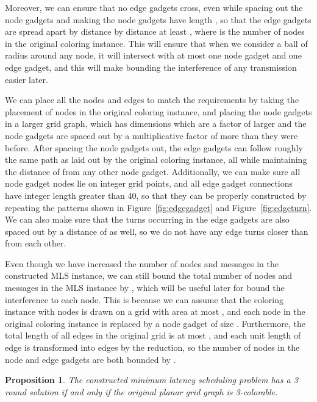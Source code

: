 \documentclass{article}
\newtheorem{proposition}[lemma]{Proposition}
\begin{document}
Moreover, we can ensure that no edge gadgets cross, even while spacing out the node gadgets and making the node gadgets have length , so that the edge gadgets are spread apart by distance by distance at least , where  is the number of nodes in the original coloring instance.  This will ensure that when we consider a ball of radius  around any node, it will intersect with at most one node gadget and one edge gadget, and this will make bounding the interference of any transmission easier later.

We can place all the nodes and edges to match the requirements by taking the placement of nodes in the original coloring instance, and placing the node gadgets in a larger grid graph, which has dimensions which are a factor of  larger and the node gadgets are spaced out by a multiplicative factor of  more than they were before.  After spacing the node gadgets out, the edge gadgets can follow roughly the same path as laid out by the original coloring instance, all while maintaining the distance of  from any other node gadget.  Additionally, we can make sure all node gadget nodes lie on integer grid points, and all edge gadget connections have integer length greater than 40, so that they can be properly constructed by repeating the patterns shown in Figure~\ref{fig:edgegadget} and Figure~\ref{fig:edgeturn}.  We can also make sure that the turns occurring in the edge gadgets are also spaced out by a distance of  as well, so we do not have any edge turns closer than  from each other.

Even though we have increased the number of nodes and messages in the constructed MLS instance, we can still bound the total number of nodes and messages in the MLS instance by , which will be useful later for bound the interference to each node.  This is because we can assume that the coloring instance with  nodes is drawn on a grid with area at most , and each node in the original coloring instance is replaced by a node gadget of size .  Furthermore, the total length of all edges in the original grid is at most , and each unit length of edge is transformed into  edges by the reduction, so the number of nodes in the node and edge gadgets are both bounded by .



\begin{proposition}
The constructed minimum latency scheduling problem has a 3 round solution if and only if the original planar grid graph is 3-colorable.
\end{proposition}
\end{document}
